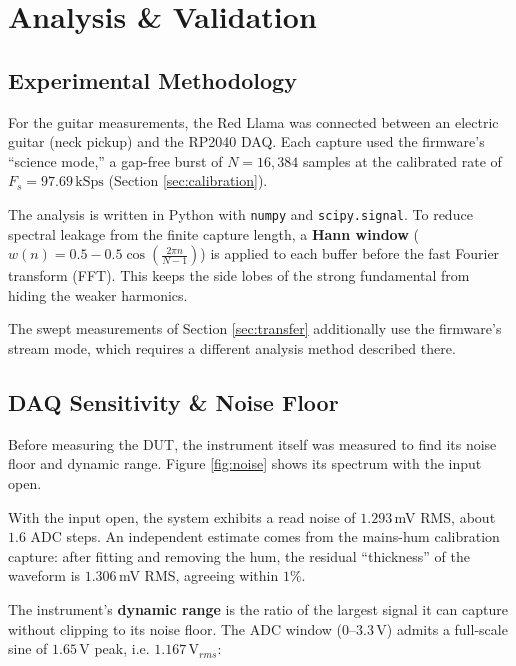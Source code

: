 \documentclass[11pt, a4paper]{report}
\begin{document}
\chapter{Analysis \& Validation}

\section{Experimental Methodology}
For the guitar measurements, the Red Llama was connected between an electric guitar (neck pickup) and the RP2040 DAQ. Each capture used the firmware's ``science mode,'' a gap-free burst of $N=16,384$ samples at the calibrated rate of $F_s = 97.69\,\text{kSps}$ (Section \ref{sec:calibration}).

The analysis is written in Python with \texttt{numpy} and \texttt{scipy.signal}.\cite{scipy_signal_tutorial,numpy_fft_fft} To reduce spectral leakage from the finite capture length, a \textbf{Hann window} ($w(n) = 0.5 - 0.5\cos(\frac{2\pi n}{N-1})$) is applied to each buffer before the fast Fourier transform (FFT).\cite{scipy_fft_tutorial, scipy_hann_window} This keeps the side lobes of the strong fundamental from hiding the weaker harmonics.\cite{harris1978_windows_dft}

The swept measurements of Section \ref{sec:transfer} additionally use the firmware's stream mode, which requires a different analysis method described there.

\section{DAQ Sensitivity \& Noise Floor}
Before measuring the DUT, the instrument itself was measured to find its noise floor and dynamic range. Figure \ref{fig:noise} shows its spectrum with the input open.

With the input open, the system exhibits a read noise of $1.293$\,mV RMS, about $1.6$ ADC steps. An independent estimate comes from the mains-hum calibration capture: after fitting and removing the hum, the residual ``thickness'' of the waveform is $1.306$\,mV RMS, agreeing within $1\%$.

The instrument's \textbf{dynamic range} is the ratio of the largest signal it can capture without clipping to its noise floor. The ADC window ($0$--$3.3$\,V) admits a full-scale sine of $1.65$\,V peak, i.e. $1.167\,\text{V}_{rms}$:
\end{document}
